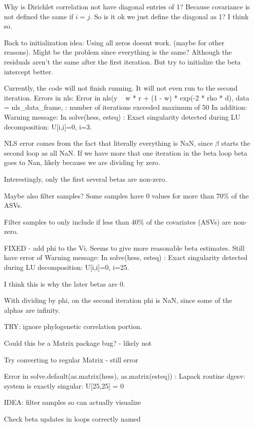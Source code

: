 \documentclass[10pt]{article}
\begin{document}
Why is Dirichlet correlation not have diagonal entries of 1? Because covariance is not defined the same if $i = j$. So is it ok we just define the diagonal as 1? I think so.


Back to initialization idea: Using all zeros doesnt work. (maybe for other reasons). Might be the problem since everything is the same? Although the residuals aren't the same after the first iteration. But try to initialize the beta intercept better.


Currently, the code will not finish running. It will not even run to the second iteration. Errors in nls:
Error in nls(y ~ w * r + (1 - w) * exp(-2 * rho * d), data = nls\_data\_frame,  :
  number of iterations exceeded maximum of 50
In addition: Warning message:
In solve(hess, esteq) :
  Exact singularity detected during LU decomposition: U[i,i]=0, i=3.


NLS error comes from the fact that literally everything is NaN, since $\beta$ starts the second loop as all NaN.
If we have more that one iteration in the beta loop beta goes to Nan, likely because we are dividing by zero.

Interestingly, only the first several betas are non-zero.


Maybe also filter samples? Some samples have 0 values for more than 70\% of the ASVs.

Filter samples to only include if less than 40\% of the covariates (ASVs) are non-zero.


FIXED - add phi to the Vi. Seems to give more reasonable beta estimates. Still have error of Warning message:
In solve(hess, esteq) :
  Exact singularity detected during LU decomposition: U[i,i]=0, i=25.

I think this is why the later betas are 0.


With dividing by phi, on the second iteration phi is NaN, since some of the alphas are infinity.




TRY: ignore phylogenetic correlation portion.


Could this be a Matrix package bug? - likely not

Try converting to regular Matrix - still error

Error in solve.default(as.matrix(hess), as.matrix(esteq)) :
  Lapack routine dgesv: system is exactly singular: U[25,25] = 0

IDEA: filter samples so can actually visualize


Check beta updates in loops correctly named
\end{document}
